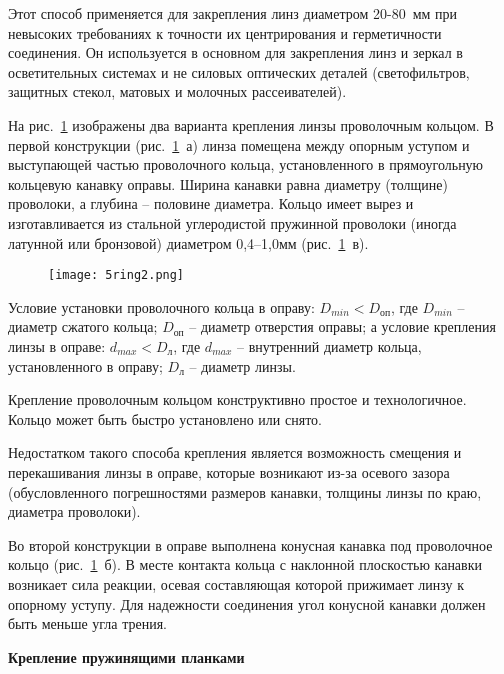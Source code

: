 Этот способ применяется для закрепления линз диаметром 20-80~мм при невысоких требованиях к точности их центрирования и герметичности соединения. Он используется в основном для закрепления линз и зеркал в осветительных системах и не силовых оптических деталей (светофильтров, защитных стекол, матовых и молочных рассеивателей).

На рис.~\ref{pic:5ring2} изображены два варианта крепления линзы проволочным кольцом. В первой конструкции (рис.~\ref{pic:5ring2}~а) линза помещена между опорным уступом и выступающей частью проволочного кольца, установленного в прямоугольную кольцевую канавку оправы. Ширина канавки равна диаметру (толщине) проволоки, а глубина -- половине диаметра. Кольцо имеет вырез и изготавливается из стальной углеродистой пружинной проволоки (иногда латунной или бронзовой) диаметром 0,4--1,0мм (рис.~\ref{pic:5ring2}~в).

\begin{figure}[h!]
	\texttt{[image: 5ring2.png]}
	\label{pic:5ring2}
\end{figure}

Условие установки проволочного кольца в оправу: $ D_{min} < D_\text{оп} $, где $ D_{min} $ -- диаметр сжатого кольца; $ D_\text{оп} $ -- диаметр отверстия оправы; а условие крепления линзы в оправе: $ d_{max} < D_\text{л} $, где $ d_{max} $ -- внутренний диаметр кольца, установленного в оправу; $ D_\text{л} $ -- диаметр линзы.

Крепление проволочным кольцом конструктивно простое и технологичное. Кольцо может быть быстро установлено или снято.

Недостатком такого способа крепления является возможность смещения и перекашивания линзы в оправе, которые возникают из-за осевого зазора (обусловленного погрешностями размеров канавки, толщины линзы по краю, диаметра проволоки).

Во второй конструкции в оправе выполнена конусная канавка под проволочное кольцо (рис.~\ref{pic:5ring2}~б). В месте контакта кольца с наклонной плоскостью канавки возникает сила реакции, осевая составляющая которой прижимает линзу к опорному уступу. Для надежности соединения угол   конусной канавки должен быть меньше угла трения.

\begin{flushleft}
	\textbf{Крепление пружинящими планками}
\end{flushleft}

